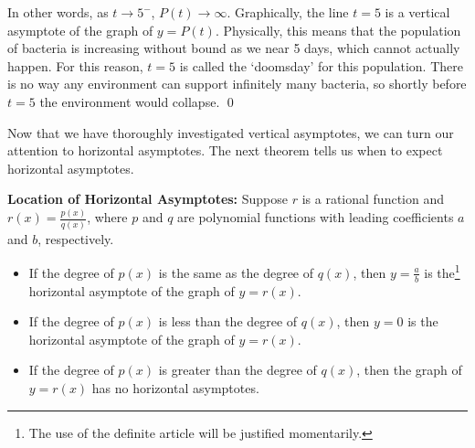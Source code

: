 \begin{ex}
\begin{enumerate}
In other words, as $t \rightarrow 5^{-}$, $P(t) \rightarrow \infty$.  Graphically, the line $t=5$ is a vertical asymptote of the graph of $y=P(t)$.  Physically, this means that the population of bacteria is increasing without bound as we near 5 days, which cannot actually happen.  For this reason, $t=5$ is called the `doomsday' for this population. There is no way any environment can support infinitely many bacteria, so shortly before $t = 5$ the environment would collapse. \qed

\end{enumerate}

Now that we have thoroughly investigated vertical asymptotes, we can turn our attention to horizontal asymptotes.  The next theorem tells us when to expect horizontal asymptotes.

\smallskip
\colorbox{ResultColor}{\bbm

\begin{thm} \textbf{Location of Horizontal Asymptotes:}\label{hathm} Suppose $r$ is a rational function and $r(x) = \frac{p(x)}{q(x)}$, where $p$ and $q$ are polynomial functions with leading coefficients $a$ and $b$, respectively. 

\begin{itemize}

\item  If the degree of $p(x)$ is the same as the degree of $q(x)$, then $y=\frac{a}{b}$ is the\footnote{The use of the definite article will be justified momentarily.} horizontal asymptote of the graph of $y=r(x)$.

\item  If the degree of $p(x)$ is less than the degree of $q(x)$, then $y=0$ is the horizontal asymptote of the graph of $y=r(x)$.

\item  If the degree of $p(x)$ is greater than the degree of $q(x)$, then the graph of $y=r(x)$ has no horizontal asymptotes.


\end{itemize}
\end{thm}
\ebm}
\smallskip

\end{ex}


